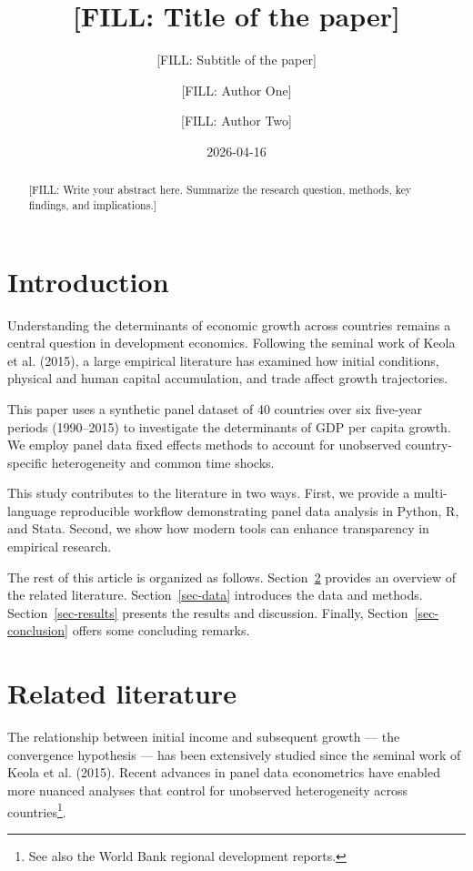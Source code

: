 \documentclass[
  letterpaper,
  DIV=11,
  numbers=noendperiod]{scrartcl}
\title{{[}FILL: Title of the paper{]}}
\subtitle{{[}FILL: Subtitle of the paper{]}}
\author{{[}FILL: Author One{]} \and {[}FILL: Author Two{]}}
\date{2026-04-16}
\begin{document}
\maketitle
\begin{abstract}
{[}FILL: Write your abstract here. Summarize the research question,
methods, key findings, and implications.{]}
\end{abstract}


\section{Introduction}\label{sec-introduction}

Understanding the determinants of economic growth across countries
remains a central question in development economics. Following the
seminal work of Keola et al. (2015), a large empirical literature has
examined how initial conditions, physical and human capital
accumulation, and trade affect growth trajectories.

This paper uses a synthetic panel dataset of 40 countries over six
five-year periods (1990--2015) to investigate the determinants of GDP
per capita growth. We employ panel data fixed effects methods to account
for unobserved country-specific heterogeneity and common time shocks.

This study contributes to the literature in two ways. First, we provide
a multi-language reproducible workflow demonstrating panel data analysis
in Python, R, and Stata. Second, we show how modern tools can enhance
transparency in empirical research.

The rest of this article is organized as follows.
Section~\ref{sec-literature} provides an overview of the related
literature. Section~\ref{sec-data} introduces the data and methods.
Section~\ref{sec-results} presents the results and discussion. Finally,
Section~\ref{sec-conclusion} offers some concluding remarks.

\section{Related literature}\label{sec-literature}

The relationship between initial income and subsequent growth --- the
convergence hypothesis --- has been extensively studied since the
seminal work of Keola et al. (2015). Recent advances in panel data
econometrics have enabled more nuanced analyses that control for
unobserved heterogeneity across countries\footnote{See also the World
  Bank regional development reports.}.
\end{document}
